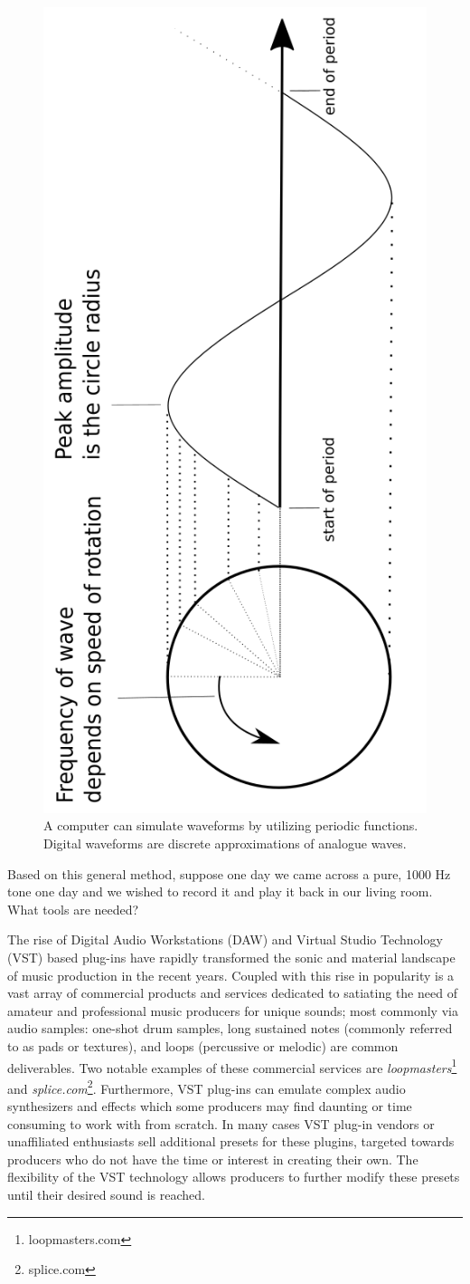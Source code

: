 \documentclass[\main/thesis.tex]{subfiles}
\begin{document}
\begin{figure}[h]
\includegraphics[width=0.45\linewidth,angle =-90 ]{images/periodic_function.png}
\caption{A computer can simulate waveforms by utilizing periodic functions. Digital waveforms are discrete approximations of analogue waves. }
\end{figure}

Based on this general method, suppose one day we came across a pure, 1000 Hz tone one day and we wished to record it and play it back in our living room. What tools are needed? 





The rise of Digital Audio Workstations (DAW) \cite{leider2004digital} and Virtual Studio Technology (VST) based plug-ins \cite{tanev2013virtual} have rapidly transformed the sonic and material landscape of music production in the recent years. Coupled with this rise in popularity is a vast array of commercial products and services dedicated to satiating the need of amateur and professional music producers for unique sounds; most commonly via audio samples: one-shot drum samples, long sustained notes (commonly referred to as pads or textures), and loops (percussive or melodic) are common deliverables. Two notable examples of these commercial services are \textit{loopmasters}\footnote{loopmasters.com} and \textit{splice.com}\footnote{splice.com}. Furthermore, VST plug-ins can emulate complex audio synthesizers and effects which some producers may find daunting or time consuming to work with from scratch. In many cases VST plug-in vendors or unaffiliated enthusiasts sell additional presets for these plugins, targeted towards producers who do not have the time or interest in creating their own. The flexibility of the VST technology allows producers to further modify these presets until their desired sound is reached.
\end{document}
